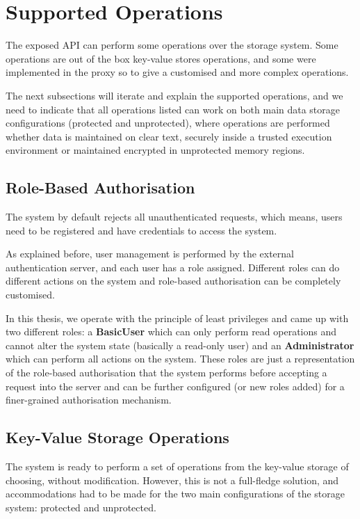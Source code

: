 \section{Supported Operations}
\label{sec:supported_operations}

The exposed \gls{API} can perform some operations over the storage system. Some operations are out of the box key-value stores operations, and some were implemented in the proxy so to give a customised and more complex operations.

The next subsections will iterate and explain the supported operations, and we need to indicate that all operations listed can work on both main data storage configurations (protected and unprotected), where operations are performed whether data is maintained on clear text, securely inside a trusted execution environment or maintained encrypted in unprotected memory regions.

\subsection{Role-Based Authorisation}
\label{ssec:role-based_authorisation}

The system by default rejects all unauthenticated requests, which means, users need to be registered and have credentials to access the system.

As explained before, user management is performed by the external authentication server, and each user has a role assigned. Different roles can do different actions on the system and role-based authorisation can be completely customised.

In this thesis, we operate with the principle of least privileges and came up with two different roles: a \textbf{BasicUser} which can only perform read operations and cannot alter the system state (basically a read-only user) and an \textbf{Administrator} which can perform all actions on the system. These roles are just a representation of the role-based authorisation that the system performs before accepting a request into the server and can be further configured (or new roles added) for a finer-grained authorisation mechanism.

\subsection{Key-Value Storage Operations}
\label{ssec:key-value_storage_operations}

The system is ready to perform a set of operations from the key-value storage of choosing, without modification. However, this is not a full-fledge solution, and accommodations had to be made for the two main configurations of the storage system: protected and unprotected.

